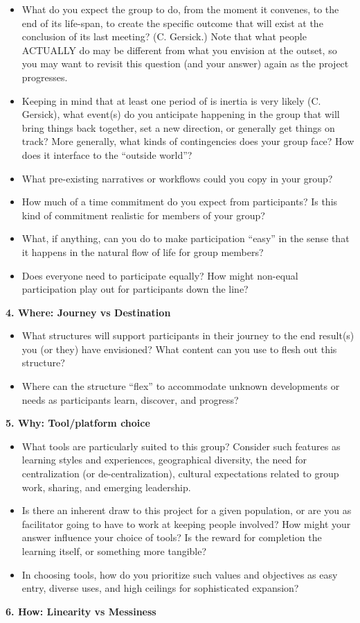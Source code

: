 \begin{itemize}
\item
  What do you expect the group to do, from the moment it convenes, to
  the end of its life-span, to create the specific outcome that will
  exist at the conclusion of its last meeting? (C. Gersick.) Note that
  what people ACTUALLY do may be different from what you envision at the
  outset, so you may want to revisit this question (and your answer)
  again as the project progresses.
\item
  Keeping in mind that at least one period of is inertia is very likely
  (C. Gersick), what event(s) do you anticipate happening in the group
  that will bring things back together, set a new direction, or
  generally get things on track? More generally, what kinds of
  contingencies does your group face? How does it interface to the
  ``outside world''?
\item
  What pre-existing narratives or workflows could you copy in your
  group?
\item
  How much of a time commitment do you expect from participants? Is this
  kind of commitment realistic for members of your group?
\item
  What, if anything, can you do to make participation ``easy'' in the
  sense that it happens in the natural flow of life for group members?
\item
  Does everyone need to participate equally? How might non-equal
  participation play out for participants down the line?
\end{itemize}
\textbf{4. Where: Journey vs Destination}

\begin{itemize}
\item
  What structures will support participants in their journey to the end
  result(s) you (or they) have envisioned? What content can you use to
  flesh out this structure?
\item
  Where can the structure ``flex'' to accommodate unknown developments
  or needs as participants learn, discover, and progress?
\end{itemize}
\textbf{5. Why: Tool/platform choice}

\begin{itemize}
\item
  What tools are particularly suited to this group? Consider such
  features as learning styles and experiences, geographical diversity,
  the need for centralization (or de-centralization), cultural
  expectations related to group work, sharing, and emerging leadership.
\item
  Is there an inherent draw to this project for a given population, or
  are you as facilitator going to have to work at keeping people
  involved? How might your answer influence your choice of tools? Is the
  reward for completion the learning itself, or something more tangible?
\item
  In choosing tools, how do you prioritize such values and objectives as
  easy entry, diverse uses, and high ceilings for sophisticated
  expansion?
\end{itemize}
\textbf{6. How: Linearity vs Messiness}

